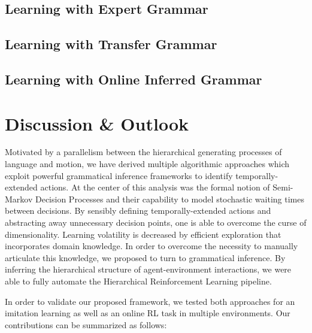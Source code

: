 \documentclass[colorinlistoftodos]{article}
\theoremstyle{definition}
\begin{document}
\subsection{Learning with Expert Grammar}



\newpage
\subsection{Learning with Transfer Grammar}



\newpage
\subsection{Learning with Online Inferred Grammar}



\newpage
\section{Discussion \& Outlook}

Motivated by a parallelism between the hierarchical generating processes of language and motion, we have derived multiple algorithmic approaches which exploit powerful grammatical inference frameworks to identify temporally-extended actions. At the center of this analysis was the formal notion of Semi-Markov Decision Processes and their capability to model stochastic waiting times between decisions. By sensibly defining temporally-extended actions and abstracting away unnecessary decision points, one is able to overcome the curse of dimensionality. Learning volatility is decreased by efficient exploration that incorporates domain knowledge.
In order to overcome the necessity to manually articulate this knowledge, we proposed to turn to grammatical inference. By inferring the hierarchical structure of agent-environment interactions, we were able to fully automate the Hierarchical Reinforcement Learning pipeline. 

In order to validate our proposed framework, we tested both approaches for an imitation learning as well as an online RL task in multiple environments. Our contributions can be summarized as follows:
\end{document}
